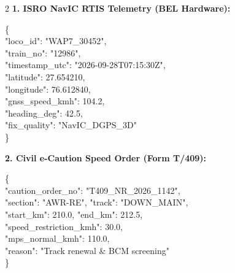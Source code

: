 \documentclass[10pt, a4paper]{article}
\begin{document}
\begin{multicols}{2}
\noindent\textbf{1. ISRO NavIC RTIS Telemetry (BEL Hardware):}
\begin{tcolorbox}[colback=codebg, colframe=bordergray, arc=1mm, boxrule=0.5pt, left=1mm, right=1mm, top=1mm, bottom=1mm]
\scriptsize\ttfamily
\{ \\
\hspace*{2mm}"loco\_id": "WAP7\_30452", \\
\hspace*{2mm}"train\_no": "12986", \\
\hspace*{2mm}"timestamp\_utc": "2026-09-28T07:15:30Z", \\
\hspace*{2mm}"latitude": 27.654210, \\
\hspace*{2mm}"longitude": 76.612840, \\
\hspace*{2mm}"gnss\_speed\_kmh": 104.2, \\
\hspace*{2mm}"heading\_deg": 42.5, \\
\hspace*{2mm}"fix\_quality": "NavIC\_DGPS\_3D" \\
\}
\end{tcolorbox}

\columnbreak

\noindent\textbf{2. Civil e-Caution Speed Order (Form T/409):}
\begin{tcolorbox}[colback=codebg, colframe=bordergray, arc=1mm, boxrule=0.5pt, left=1mm, right=1mm, top=1mm, bottom=1mm]
\scriptsize\ttfamily
\{ \\
\hspace*{2mm}"caution\_order\_no": "T409\_NR\_2026\_1142", \\
\hspace*{2mm}"section": "AWR-RE", "track": "DOWN\_MAIN", \\
\hspace*{2mm}"start\_km": 210.0, "end\_km": 212.5, \\
\hspace*{2mm}"speed\_restriction\_kmh": 30.0, \\
\hspace*{2mm}"mps\_normal\_kmh": 110.0, \\
\hspace*{2mm}"reason": "Track renewal \& BCM screening" \\
\}
\end{tcolorbox}
\end{multicols}
\end{document}
